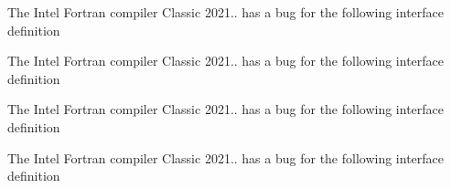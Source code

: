 
\begin{DoxyRefList}
\item[Type \mbox{\hyperlink{interfaceArrayContains__mod_1_1genReplaced}{Array\+Contains\+\_\+mod\+::gen\+Replaced}} ]\label{bug__bug000001}%
%
 The Intel Fortran compiler Classic 2021.. has a bug for the following interface definition  
\item[Type \mbox{\hyperlink{interfaceArrayContains__mod_1_1getReplaced}{Array\+Contains\+\_\+mod\+::get\+Replaced}} ]\label{bug__bug000002}%
%
 The Intel Fortran compiler Classic 2021.. has a bug for the following interface definition  
\item[Type \mbox{\hyperlink{interfaceArrayReplace__mod_1_1genReplaced}{Array\+Replace\+\_\+mod\+::gen\+Replaced}} ]\label{bug__bug000003}%
%
 The Intel Fortran compiler Classic 2021.. has a bug for the following interface definition  
\item[Type \mbox{\hyperlink{interfaceArrayReplace__mod_1_1getReplaced}{Array\+Replace\+\_\+mod\+::get\+Replaced}} ]\label{bug__bug000004}%
%
 The Intel Fortran compiler Classic 2021.. has a bug for the following interface definition 
\end{DoxyRefList}